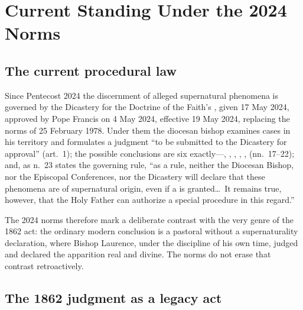\section{Current Standing Under the 2024 Norms}

\subsection{The current procedural law}

Since Pentecost 2024 the discernment of alleged supernatural
phenomena is governed by the Dicastery for the Doctrine of the
Faith's , given 17 May 2024, approved by Pope
Francis on 4 May 2024, effective 19 May 2024, replacing the norms
of 25 February 1978. Under them the diocesan bishop examines
cases in his territory and formulates a judgment ``to be
submitted to the Dicastery for approval'' (art.~1); the possible
conclusions are six exactly---, , , ,
,  (nn.~17--22); and, as n.~23 states the
governing rule, ``as a rule, neither the Diocesan Bishop, nor
the Episcopal Conferences, nor the Dicastery will declare that
these phenomena are of supernatural origin, even if a  is granted\ldots\ It remains true, however, that the
Holy Father can authorize a special procedure in this
regard.''

The 2024 norms therefore mark a deliberate contrast with the
very genre of the 1862 act: the ordinary modern conclusion is a
pastoral  without a supernaturality
declaration, where Bishop Laurence, under the discipline of his
own time, judged and declared the apparition real and divine.
The norms do not erase that contrast retroactively.

\subsection{The 1862 judgment as a legacy act}

